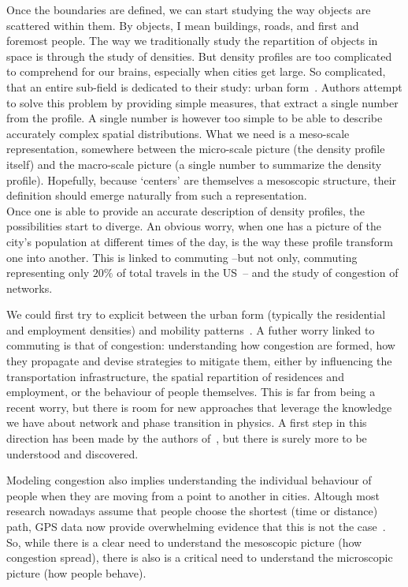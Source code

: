 Once the boundaries are defined, we can start studying the way objects are
scattered within them. By objects, I mean buildings, roads, and first and
foremost people. The way we traditionally study the repartition of objects in
space is through the study of densities. But density profiles are too
complicated to comprehend for our brains, especially when cities get large. So
complicated, that an entire sub-field is dedicated to their study: urban
form~\cite{Tsai:2005,Schwarz:2010,LeNechet:2015}.
Authors attempt to solve this problem by providing simple measures,
that extract a single number from the profile. A single number is however too
simple to be able to describe accurately complex spatial distributions. What we need
is a meso-scale representation, somewhere between the micro-scale picture (the
density profile itself) and the macro-scale picture (a single number to
summarize the density profile). Hopefully, because `centers' are themselves a
mesoscopic structure, their definition should emerge naturally from such a
representation.\\


Once one is able to provide an accurate description of density profiles, the
possibilities start to diverge. An obvious worry, when one has a picture of the
city's population at different times of the day, is the way these profile
transform one into another. This is linked to commuting --but not only,
commuting representing only $20\%$ of total travels in the
US~\cite{FHWA-PL-11-022}-- and the study of congestion of networks. 

We could first try to explicit between the urban form (typically the residential
and employment densities) and mobility patterns~\cite{Ma:2006,Chowdhury:2013}.
A futher worry linked to commuting is that of congestion: understanding how
congestion are formed, how they propagate and devise strategies to mitigate
them, either by influencing the transportation infrastructure, the spatial
repartition of residences and employment, or the behaviour of people themselves.
This is far from being a recent worry, but there is room for new approaches that
leverage the knowledge we have about network and phase transition in physics. A
first step in this direction has been made by the authors of~\cite{Li:2015},
but there is surely more to be understood and discovered.  

Modeling congestion also implies understanding the individual behaviour of
people when they are moving from a point to another in cities. Altough most
research nowadays assume that people choose the shortest (time or distance)
path, GPS data now provide overwhelming evidence that this is not the
case~\cite{Manley:2015}. So, while there is a clear need to understand the mesoscopic
picture (how congestion spread), there is also is a critical need to understand
the microscopic picture (how people behave).\\


